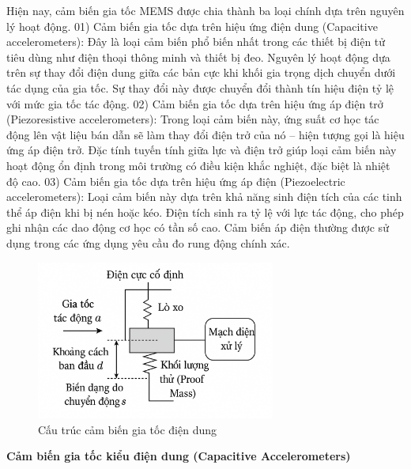 Hiện nay, cảm biến gia tốc MEMS được chia thành ba loại chính dựa trên nguyên lý hoạt động. 01) Cảm biến gia tốc dựa trên hiệu ứng điện dung (Capacitive accelerometers): 
Đây là loại cảm biến phổ biến nhất trong các thiết bị điện tử tiêu dùng như điện thoại thông minh 
và thiết bị đeo. Nguyên lý hoạt động dựa trên sự thay đổi điện dung giữa 
các bản cực khi khối gia trọng dịch chuyển dưới tác dụng của gia tốc. 
Sự thay đổi này được chuyển đổi thành tín hiệu điện tỷ lệ với mức gia tốc tác động. 
02) Cảm biến gia tốc dựa trên hiệu ứng áp điện trở (Piezoresistive accelerometers): 
Trong loại cảm biến này, ứng suất cơ học tác động lên vật liệu bán dẫn 
sẽ làm thay đổi điện trở của nó – hiện tượng gọi là hiệu ứng áp điện 
trở. Đặc tính tuyến tính giữa lực và điện trở giúp loại cảm biến này 
hoạt động ổn định trong môi trường có điều kiện khắc nghiệt, đặc biệt là 
nhiệt độ cao. 03) Cảm biến gia tốc dựa trên hiệu ứng áp điện 
(Piezoelectric accelerometers): Loại cảm biến này dựa trên khả năng 
sinh điện tích của các tinh thể áp điện khi bị nén hoặc kéo. Điện tích 
sinh ra tỷ lệ với lực tác động, cho phép ghi nhận các dao động cơ học 
có tần số cao. Cảm biến áp điện thường được sử dụng trong các ứng dụng 
yêu cầu đo rung động chính xác.



\begin{figure}[H]
	\centering
	\includegraphics[width=0.7\textwidth]{images/diendung.png}
	\vspace*{-7mm}
	\caption{Cấu trúc cảm biến gia tốc điện dung}
	\label{acce_mems}
\end{figure}




\textbf{Cảm biến gia tốc kiểu điện dung (Capacitive Accelerometers)}

